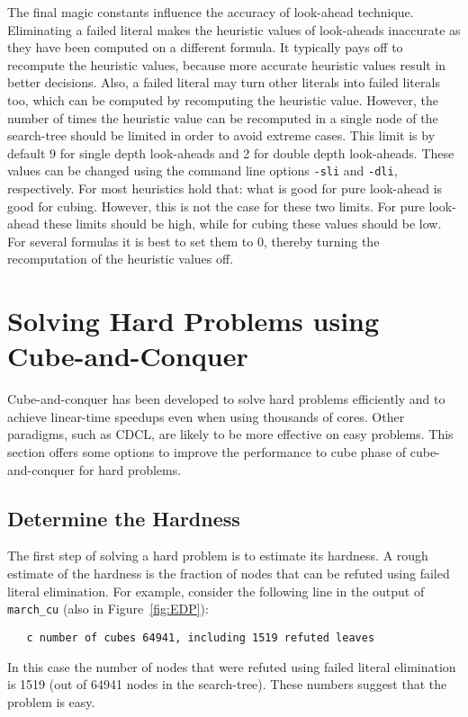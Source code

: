 \documentclass{llncs}
\begin{document}
The final magic constants influence the accuracy of look-ahead technique. Eliminating a failed literal makes the heuristic values
of look-aheads inaccurate as they have been computed on a different formula. It typically pays off to recompute the heuristic 
values, because more accurate heuristic values result in better decisions. Also, a failed literal may turn other literals into failed
literals too, which can be computed by recomputing the heuristic value. However, the number of times the 
heuristic value can be recomputed in a single node of the search-tree should be limited in order to avoid extreme cases.
This limit is by default 9 for single depth look-aheads  and 2 for double depth look-aheads. These values can be changed using
the command line options {\tt -sli} and {\tt -dli}, respectively. For most heuristics hold that: what is good for pure look-ahead is 
good for cubing. However, this is not the case for these two limits. For pure look-ahead these limits should be high, while for 
cubing these values should be low. For several formulas it is best to set them to 0, thereby turning the recomputation of 
the heuristic values off.

\section{Solving Hard Problems using Cube-and-Conquer}

Cube-and-conquer has been developed to solve hard problems efficiently and to achieve linear-time speedups even when using
thousands of cores. Other paradigms, such as CDCL, are likely to be more effective on easy problems. This section offers some 
options to improve the performance to cube phase of cube-and-conquer for hard problems. 

\subsection{Determine the Hardness}

The first step of solving a hard problem is to estimate its hardness. A rough estimate of the hardness is the fraction of nodes that can
be refuted using failed literal elimination. For example, consider the following line in
the output of {\tt march\_cu} (also in Figure~\ref{fig:EDP}):
%
\begin{verbatim}
   c number of cubes 64941, including 1519 refuted leaves
\end{verbatim}
%
In this case the number of nodes that were refuted using failed literal elimination is 1519 (out of 64941 nodes in the search-tree). 
These numbers suggest that the problem is easy. 
\end{document}
